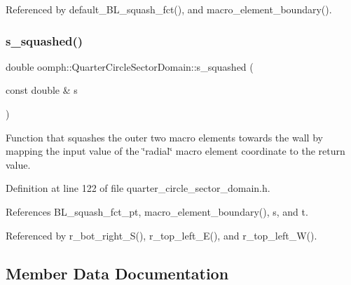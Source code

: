 Referenced by default\+\_\+\+B\+L\+\_\+squash\+\_\+fct(), and macro\+\_\+element\+\_\+boundary().

\mbox{\label{classoomph_1_1QuarterCircleSectorDomain_a5b66f846233b3cf976ed63d9bf54f0c7}} 
\subsubsection{\texorpdfstring{s\+\_\+squashed()}{s\_squashed()}}
{\footnotesize\ttfamily double oomph\+::\+Quarter\+Circle\+Sector\+Domain\+::s\+\_\+squashed (\begin{DoxyParamCaption}\item[{const double \&}]{s }\end{DoxyParamCaption})\hspace{0.3cm}{\ttfamily [inline]}}



Function that squashes the outer two macro elements towards the wall by mapping the input value of the \char`\"{}radial\char`\"{} macro element coordinate to the return value. 



Definition at line 122 of file quarter\+\_\+circle\+\_\+sector\+\_\+domain.\+h.



References B\+L\+\_\+squash\+\_\+fct\+\_\+pt, macro\+\_\+element\+\_\+boundary(), s, and t.



Referenced by r\+\_\+bot\+\_\+right\+\_\+\+S(), r\+\_\+top\+\_\+left\+\_\+\+E(), and r\+\_\+top\+\_\+left\+\_\+\+W().



\subsection{Member Data Documentation}
\mbox{\label{classoomph_1_1QuarterCircleSectorDomain_ae9b74ffcade9fdc1eeba26b4acced7a8}} 
